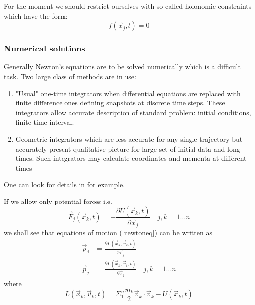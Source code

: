 For the moment we should restrict ourselves with so called holonomic
constraints which have the form:
\begin{equation}
        f(\vec x_j,t)=0 \label {hol-const}
\end{equation}

\subsubsection{Numerical solutions}

Generally Newton's equations are to be solved numerically which is a difficult
task. Two large class of methods are in use: 
\begin{enumerate} 
    \item "Usual" one-time integrators when differential equations are replaced
        with finite difference ones defining snapshots at discrete time steps.
        These integrators allow accurate description of standard problem:
        initial conditions, finite time interval. 

\item Geometric integrators which are less accurate for any single trajectory
    but accurately present qualitative picture for large set of initial data
        and long times. Such integrators may calculate  coordinates and momenta
        at different times
\end{enumerate}
One can look for details in \cite{Hairer-Lubich-Wanner} for example. 

If we allow only potential forces i.e. 
\begin{equation}
  \label {potforce}
        \vec F_j(\vec x_k,t)=-\frac{\partial U(\vec x_k,t)}{\partial \vec x_j} \quad j,k=1\ldots n 
\end{equation}
we shall see that equations of motion (\ref{newtoneq}) can be written as 
\begin{equation}
   \label {lagr}
   \begin{split}
      \vec p_j&=\frac{\partial L(\vec x_k,\vec v_k,t)}{\partial \vec v_j} \\ 
        \dot \vec p_j&= \frac{\partial L(\vec x_k,\vec v_k,t)}{\partial \vec x_j}\quad j,k=1\ldots n 
   \end{split}
\end{equation}  
where 
\begin{equation}
  \label{lagr3}
        L(\vec x_k,\vec v_k,t)=\Sigma_1^n \frac{m_k}{2} \vec v_k \cdot \vec v_k-U(\vec x_k,t) 
\end{equation}

